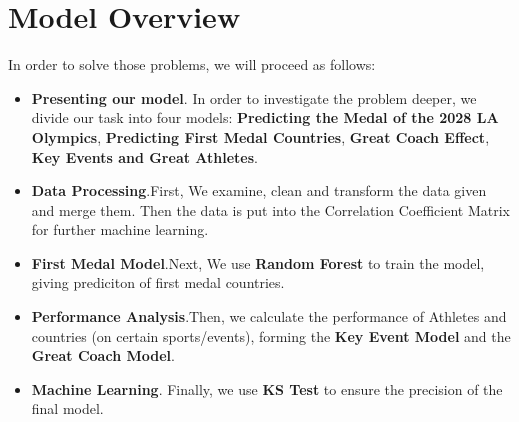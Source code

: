 \section{Model Overview}


In order to solve those problems, we will proceed as follows:

\begin{itemize}
    \begin{figure}[htbp]
        \centering
        \texttt{[image: ./figures/figure1\_work\_flow.png]}
        \caption{Flow chart of our work}
        \label{fig:example}
    \end{figure}
    
\item {\bf Presenting our model}. In order to investigate the problem deeper, we divide our task into four models: \textbf{Predicting the Medal of the 2028 LA Olympics}, \textbf{Predicting First Medal Countries}, \textbf{Great Coach Effect}, \textbf{Key Events and Great Athletes}.

\item {\bf Data Processing}.First, We examine, clean and transform the data given and merge them. Then the data is put into the Correlation Coefficient Matrix for further machine learning.

\item {\bf First Medal Model}.Next, We use \textbf{Random Forest} to train the model, giving prediciton of first medal countries.

\item{\bf Performance Analysis}.Then, we calculate the performance of Athletes and countries (on certain sports/events), forming the \textbf{Key Event Model} and the \textbf{Great Coach Model}.

\item {\bf Machine Learning}. Finally, we use \textbf{KS Test} to ensure the precision of the final model.
\end{itemize}
